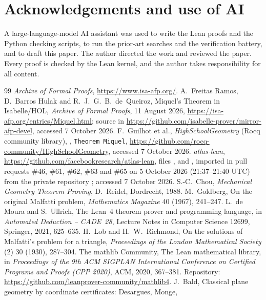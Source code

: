 \documentclass[11pt]{article}
\theoremstyle{definition}
\theoremstyle{remark}
\newcommand{\lean}[1]{\texttt{#1}}
\begin{document}
\section*{Acknowledgements and use of AI}
A large-language-model AI assistant was used to write the Lean proofs and the Python checking
scripts, to run the prior-art searches and the verification battery, and to draft this paper. The
author directed the work and reviewed the paper. Every proof is checked by the Lean kernel, and
the author takes responsibility for all content.

\begin{thebibliography}{99}\sloppy
{} \emph{Archive of Formal Proofs}, \url{https://www.isa-afp.org/}.
 A.~Freitas Ramos, D.~Barros Hulak and R.~J.~G.~B.~de~Queiroz, Miquel's
Theorem in Isabelle/HOL, \emph{Archive of Formal Proofs}, 11 August 2026,
\url{https://isa-afp.org/entries/Miquel.html}; source  in
\url{https://github.com/isabelle-prover/mirror-afp-devel}, accessed 7 October 2026.
 F.~Guilhot et al., \emph{HighSchoolGeometry} (Rocq community library),
, \lean{Theorem Miquel},
\url{https://github.com/rocq-community/HighSchoolGeometry}, accessed 7 October 2026.
 \emph{atlas-lean}, \url{https://github.com/facebookresearch/atlas-lean}, files
,  and , imported
in pull requests \#46, \#61, \#62, \#63 and \#65 on 5 October 2026 (21:37--21:40 UTC) from the
private repository ; accessed 7 October 2026.
 S.-C.~Chou, \emph{Mechanical Geometry Theorem Proving}, D.~Reidel, Dordrecht, 1988.
 M.~Goldberg, On the original Malfatti problem, \emph{Mathematics Magazine}
40 (1967), 241--247.
 L.~de Moura and S.~Ullrich, The Lean~4 theorem prover and programming language, in
\emph{Automated Deduction -- CADE~28}, Lecture Notes in Computer Science 12699, Springer, 2021,
625--635.
 H.~Lob and H.~W.~Richmond, On the solutions of Malfatti's problem for a
triangle, \emph{Proceedings of the London Mathematical Society} (2) 30 (1930), 287--304.
 The mathlib Community, The Lean mathematical library, in \emph{Proceedings of the
9th ACM SIGPLAN International Conference on Certified Programs and Proofs (CPP 2020)}, ACM, 2020,
367--381. Repository: \url{https://github.com/leanprover-community/mathlib4}.
 J.~Bald, Classical plane geometry by coordinate certificates: Desargues, Monge,

\end{thebibliography}
\end{document}
